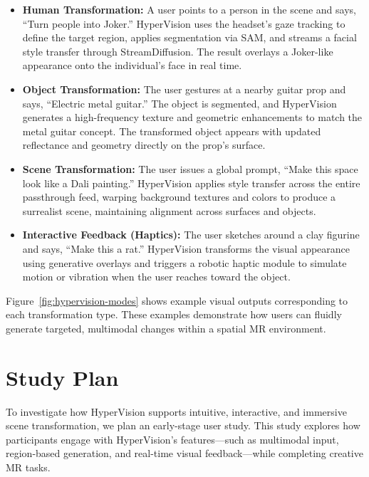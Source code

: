 \begin{itemize}
    \item \textbf{Human Transformation:} A user points to a person in the scene and says, “Turn people into Joker.” HyperVision uses the headset’s gaze tracking to define the target region, applies segmentation via SAM, and streams a facial style transfer through StreamDiffusion. The result overlays a Joker-like appearance onto the individual’s face in real time.

    \item \textbf{Object Transformation:} The user gestures at a nearby guitar prop and says, “Electric metal guitar.” The object is segmented, and HyperVision generates a high-frequency texture and geometric enhancements to match the metal guitar concept. The transformed object appears with updated reflectance and geometry directly on the prop’s surface.

    \item \textbf{Scene Transformation:} The user issues a global prompt, “Make this space look like a Dali painting.” HyperVision applies style transfer across the entire passthrough feed, warping background textures and colors to produce a surrealist scene, maintaining alignment across surfaces and objects.

    \item \textbf{Interactive Feedback (Haptics):} The user sketches around a clay figurine and says, “Make this a rat.” HyperVision transforms the visual appearance using generative overlays and triggers a robotic haptic module to simulate motion or vibration when the user reaches toward the object.
\end{itemize}

Figure~\ref{fig:hypervision-modes} shows example visual outputs corresponding to each transformation type. These examples demonstrate how users can fluidly generate targeted, multimodal changes within a spatial MR environment.


\section{Study Plan}

To investigate how HyperVision supports intuitive, interactive, and immersive scene transformation, we plan an early-stage user study. This study explores how participants engage with HyperVision’s features—such as multimodal input, region-based generation, and real-time visual feedback—while completing creative MR tasks.


